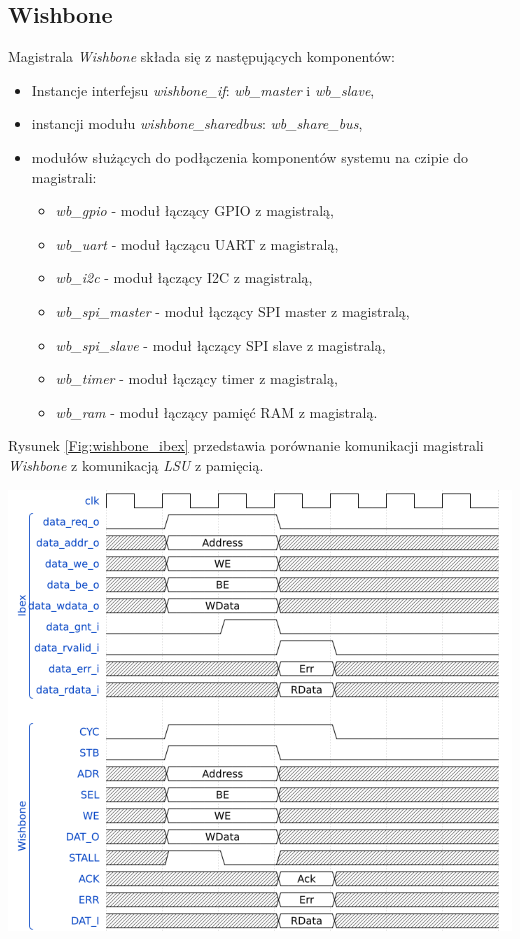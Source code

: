 \documentclass[11pt,a4paper]{article}
\begin{document}
	\subsection{Wishbone}
	\hspace{5mm}
Magistrala \textit{Wishbone} składa się z następujących komponentów:
\begin{itemize}
\item Instancje interfejsu \textit{wishbone\_if}: \textit{wb\_master} i \textit{wb\_slave},
\item instancji modułu \textit{wishbone\_sharedbus}: \textit{wb\_share\_bus},
\item modułów służących do podłączenia komponentów systemu na czipie do magistrali:
	\begin{itemize}
		\item \textit{wb\_gpio} - moduł łączący GPIO z magistralą,
		\item \textit{wb\_uart} - moduł łączącu UART z magistralą,
		\item \textit{wb\_i2c} - moduł łączący I2C z magistralą,
		\item \textit{wb\_spi\_master} - moduł łączący SPI master z magistralą,
		\item \textit{wb\_spi\_slave} - moduł łączący SPI slave z magistralą,
		\item \textit{wb\_timer} - moduł łączący timer z magistralą,
		\item \textit{wb\_ram} - moduł łączący pamięć RAM z magistralą.
	\end{itemize}
\end{itemize}
Rysunek \ref{Fig:wishbone_ibex} przedstawia porównanie komunikacji magistrali \textit{Wishbone} z komunikacją \textit{LSU} z pamięcią.

			\begin{minipage}{\textwidth}
					\includegraphics[width=14cm]{./rysunki/timing.png}
			\end{minipage} 
\end{document}
